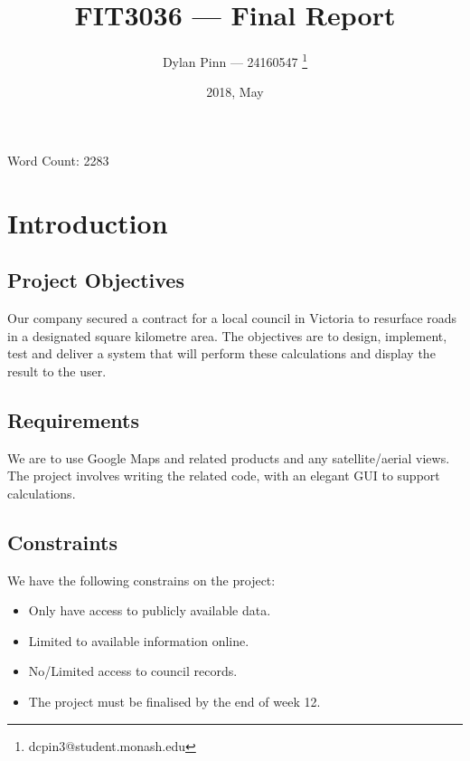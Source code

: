 \documentclass[a4paper,11pt]{article}
\title{FIT3036 --- Final Report}
\author{Dylan Pinn --- 24160547 \thanks{dcpin3@student.monash.edu}}
\date{2018, May}
\begin{document}
\maketitle
\vspace{-1ex}
\begin{center}
  Word Count: 2283
\end{center}

\begin{abstract}
\end{abstract}
\pagebreak

\tableofcontents
\pagebreak

\section{Introduction}

\subsection{Project Objectives}

Our company secured a contract for a local council in Victoria to resurface
roads in a designated square kilometre area. The objectives are to design,
implement, test and deliver a system that will perform these calculations and
display the result to the user.

\subsection{Requirements}

We are to use Google Maps and related products and any satellite/aerial views.
The project involves writing the related code, with an elegant GUI to support
calculations. \autocite[2]{intro:1}

\subsection{Constraints}

We have the following constrains on the project:

\begin{itemize}
  \item Only have access to publicly available data.
  \item Limited to available information online.
  \item No/Limited access to council records.
  \item The project must be finalised by the end of week 12.
\end{itemize}
\end{document}
